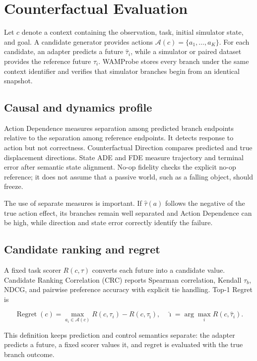 \documentclass[10pt]{article}
\begin{document}
\section{Counterfactual Evaluation}

Let $c$ denote a context containing the observation, task, initial simulator state, and
goal. A candidate generator provides actions $\mathcal{A}(c)=\{a_1,\ldots,a_K\}$. For each
candidate, an adapter predicts a future $\hat{\tau}_i$, while a simulator or paired dataset
provides the reference future $\tau_i$. WAMProbe stores every branch under the same context
identifier and verifies that simulator branches begin from an identical snapshot.

\subsection{Causal and dynamics profile}

Action Dependence measures separation among predicted branch endpoints relative to the
separation among reference endpoints. It detects response to action but not correctness.
Counterfactual Direction compares predicted and true displacement directions. State ADE
and FDE measure trajectory and terminal error after semantic state alignment. No-op
fidelity checks the explicit no-op reference; it does not assume that a passive world,
such as a falling object, should freeze.

The use of separate measures is important. If $\hat{\tau}(a)$ follows the negative of the
true action effect, its branches remain well separated and Action Dependence can be high,
while direction and state error correctly identify the failure.

\subsection{Candidate ranking and regret}

A fixed task scorer $R(c,\tau)$ converts each future into a candidate value. Candidate
Ranking Correlation (CRC) reports Spearman correlation, Kendall $\tau_b$, NDCG, and
pairwise preference accuracy with explicit tie handling. Top-1 Regret is

\begin{equation}
\operatorname{Regret}(c)=
\max_{a_i\in\mathcal{A}(c)}R(c,\tau_i)
- R(c,\tau_{\hat\imath}),
\quad
\hat\imath=\arg\max_i R(c,\hat\tau_i).
\end{equation}

This definition keeps prediction and control semantics separate: the adapter predicts a
future, a fixed scorer values it, and regret is evaluated with the true branch outcome.
\end{document}
